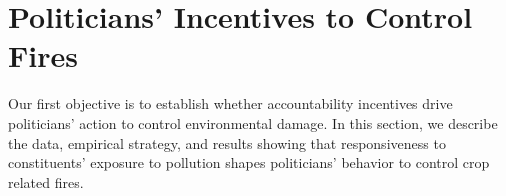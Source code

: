 \documentclass[12pt]{article}
\begin{document}

\section{Politicians' Incentives to Control Fires}

Our first objective is to establish whether  accountability incentives drive politicians' action to control environmental damage. 
In this section, we describe the data, empirical strategy, and results showing that responsiveness to constituents' exposure to pollution shapes politicians’ behavior to control crop related fires.

\end{document}
